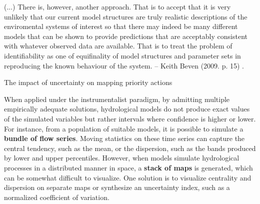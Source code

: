 \documentclass[./main_en.tex]{subfiles}
\begin{document}
\begin{adjustwidth}{100pt}{0pt}
\medskip
\small (...) There is, however, another approach. That is to accept that it is very unlikely that our current model structures are truly realistic descriptions of the enviromental systems of interest so that there may indeed be many different models that can be shown to provide predictions that are acceptably consistent with whatever observed data are available. That is to treat the problem of identifiability as one of equifinality of model structures and parameter sets in reproducing the known behaviour of the system. -- Keith Beven (2009. p. 15) \cite{Beven2009}.
\medskip
\end{adjustwidth}

\begin{simplebox}[
    float=ht!,
    label={highlight_uncertainty_maps},
    nameref={Uncertainty Maps}
    ]{The impact of uncertainty on mapping priority actions}
    \footnotesize
    \begin{minipage}[t]{\linewidth}  
    \par When applied under the instrumentalist paradigm, by admitting multiple empirically adequate solutions, hydrological models do not produce exact values of the simulated variables but rather intervals where confidence is higher or lower. For instance, from a population of suitable models, it is possible to simulate a \textbf{bundle of flow series}. Moving statistics on these time series can capture the central tendency, such as the mean, or the dispersion, such as the bands produced by lower and upper percentiles. However, when models simulate hydrological processes in a distributed manner in space, a \textbf{stack of maps} is generated, which can be somewhat difficult to visualize. One solution is to visualize centrality and dispersion on separate maps or synthesize an uncertainty index, such as a normalized coefficient of variation.
    \end{minipage}
    

\end{simplebox}
\end{document}
